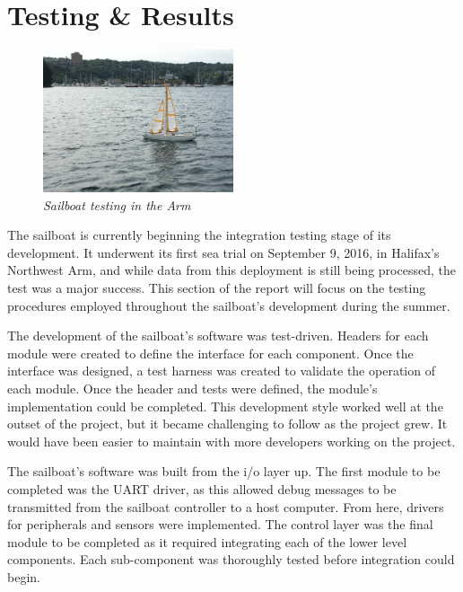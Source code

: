 \documentclass[12pt]{article}
\begin{document}
\section{Testing \& Results}

\begin{figure}
	\centering
	\includegraphics[width=0.5\textwidth]{figures/sailboat_test.jpg}
	\caption[Sailboat testing in the Arm]{\textsl{Sailboat testing in the Arm}}
	\label{fig:sail_test}
\end{figure}

The sailboat is currently beginning the integration testing stage of its development. It underwent its first sea trial on September 9, 2016, in Halifax's Northwest Arm, and while data from this deployment is still being processed, the test was a major success. This section of the report will focus on the testing procedures employed throughout the sailboat's development during the summer.

The development of the sailboat's software was test-driven. Headers for each module were created to define the interface for each component. Once the interface was designed, a test harness was created to validate the operation of each module. Once the header and tests were defined, the module's implementation could be completed. This development style worked well at the outset of the project, but it became challenging to follow as the project grew. It would have been easier to maintain with more developers working on the project. 

The sailboat's software was built from the i/o layer up. The first module to be completed was the UART driver, as this allowed debug messages to be transmitted from the sailboat controller to a host computer. From here, drivers for peripherals and sensors were implemented. The control layer was the final module to be completed as it required integrating each of the lower level components. Each sub-component was thoroughly tested before integration could begin.
\end{document}
